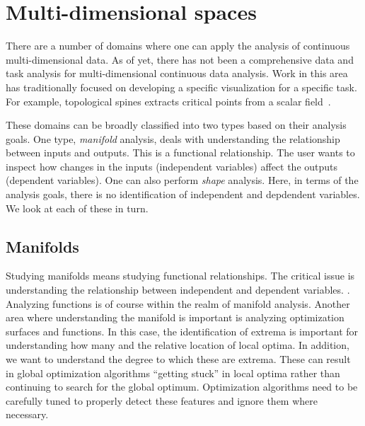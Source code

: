 
\section{Multi-dimensional spaces}
\label{sec:motivation:multi-d}

There are a number of domains where one can apply the analysis of
continuous multi-dimensional data.  As of yet, there has not been a
comprehensive data and task analysis for multi-dimensional continuous data
analysis. Work in this area has traditionally focused on developing a specific
visualization for a specific task. For example, topological spines extracts
critical points from a scalar field~\cite{Correa:2011}.



These domains can be broadly classified into two types based on their analysis
goals. One type, \emph{manifold} analysis, deals with understanding the
relationship between inputs and outputs. This is a functional relationship.
The user wants to inspect how changes in the inputs (independent variables)
affect the outputs (dependent variables). One can also perform \emph{shape}
analysis. Here, in terms of the analysis goals, there is no identification of
independent and depdendent variables. We look at each of these in turn.

\subsection{Manifolds}
\label{sec:manifolds}

Studying manifolds means studying functional relationships. The critical issue
is understanding the relationship between independent and dependent variables.
. Analyzing functions is of course within the realm of
manifold analysis.  Another area where understanding
the manifold is important is analyzing optimization surfaces and functions.  In
this case, the identification of extrema is important for understanding how
many and the relative location of local optima. In addition, we want to
understand the degree to which these are extrema. These can result in global
optimization algorithms ``getting stuck'' in local optima rather than
continuing to search for the global optimum. Optimization algorithms need to be
carefully tuned to properly detect these features and ignore them where
necessary.

